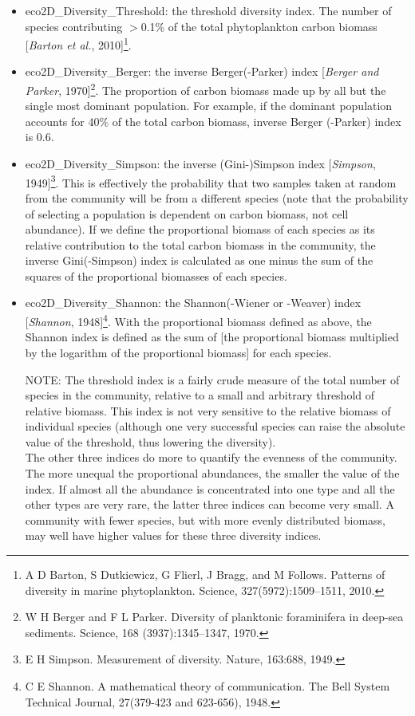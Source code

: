 \documentclass[11pt,fleqn]{book} %
\begin{document}
\begin{itemize}[noitemsep]
\begin{itemize}[noitemsep]
\item \textsf{\footnotesize eco2D\_Diversity\_Threshold}: the threshold diversity index. The number of species contributing $>$0.1\% of the total phytoplankton carbon biomass [\textit{Barton et al.}, 2010]\footnote{A D Barton, S Dutkiewicz, G Flierl, J Bragg, and M Follows. Patterns of diversity in marine phytoplankton. Science, 327(5972):1509–1511, 2010.}.
\item \textsf{\footnotesize eco2D\_Diversity\_Berger}: the inverse Berger(-Parker) index  [\textit{Berger and Parker}, 1970]\footnote{W H Berger and F L Parker. Diversity of planktonic foraminifera in deep-sea sediments. Science, 168 (3937):1345–1347, 1970.}. The proportion of carbon biomass made up by all but the single most dominant population. For example, if the dominant population accounts for 40\% of the total carbon biomass, inverse Berger (-Parker) index is 0.6.
\item \textsf{\footnotesize eco2D\_Diversity\_Simpson}: the inverse (Gini-)Simpson index [\textit{Simpson}, 1949]\footnote{E H Simpson. Measurement of diversity. Nature, 163:688, 1949.}. This is effectively the probability that two samples taken at random from the community will be from a different species (note that the probability of selecting a population is dependent on carbon biomass, not cell abundance). If we define the proportional biomass of each species as its relative contribution to the total carbon biomass in the community, the inverse Gini(-Simpson) index is calculated as one minus the sum of the squares of the proportional biomasses of each species.
\item \textsf{\footnotesize eco2D\_Diversity\_Shannon}: the Shannon(-Wiener or -Weaver) index  [\textit{Shannon}, 1948]\footnote{C E Shannon. A mathematical theory of communication. The Bell System Technical Journal, 27(379-423 and 623-656), 1948.}. With the proportional biomass defined as above, the Shannon index is defined as the sum of [the proportional biomass multiplied by the logarithm of the proportional biomass] for each species.
\item[NOTE:]The threshold index is a fairly crude measure of the total number of species in the community, relative to a small and arbitrary threshold of relative biomass. This index is not very sensitive to the relative biomass of individual species (although one very successful species can raise the absolute value of the threshold, thus lowering the diversity).
\\The other three indices do more to quantify the evenness of the community. The more unequal the proportional abundances, the smaller the value of the index. If almost all the abundance is concentrated into one type and all the other types are very rare, the latter three indices can become very small. A community with fewer species, but with more evenly distributed biomass, may well have higher values for these three diversity indices.
\end{itemize}

\end{itemize}
\vspace{1mm}
\end{document}
